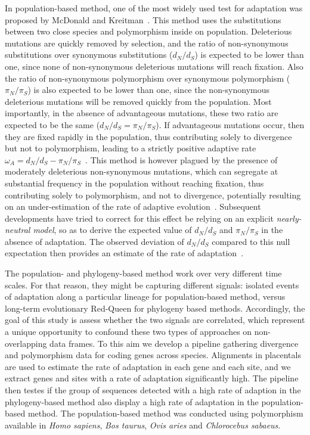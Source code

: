 \documentclass{article}
\newcommand{\dn}{d_N}
\newcommand{\ds}{d_S}
\newcommand{\dnds}{\dn / \ds}
\newcommand{\pn}{\pi_N}
\newcommand{\ps}{\pi_S}
\newcommand{\pnps}{\pn / \ps}
\begin{document}
In population-based method, one of the most widely used test for adaptation was proposed by McDonald and Kreitman~\citep{mcdonald_adaptative_1991}.
This method uses the substitutions between two close species and polymorphism inside on population.
Deleterious mutations are quickly removed by selection, and the ratio of non-synonymous substitutions over synonymous substitutions ($\dnds$) is expected to be lower than one, since none of non-synonymous deleterious mutations will reach fixation.
Also the ratio of non-synonymous polymorphism over synonymous polymorphism ($\pnps$) is also expected to be lower than one, since the non-synonymous deleterious mutations will be removed quickly from the population.
Most importantly, in the absence of advantageous mutations, these two ratio are expected to be the same ($\dnds=\pnps$).
If advantageous mutations occur, then they are fixed rapidly in the population, thus contributing solely to divergence but not to polymorphism, leading to a strictly positive adaptive rate $\omega_A = \dnds-\pnps$~\citep{smith_adaptive_2002}.
This method is however plagued by the presence of moderately deleterious non-synonymous mutations, which can segregate at substantial frequency in the population without reaching fixation, thus contributing solely to polymorphism, and not to divergence, potentially resulting on an under-estimation of the rate of adaptive evolution~\citep{eyre-walker_quantifying_2002}.
Subsequent developments have tried to correct for this effect be relying on an explicit \textit{nearly-neutral model}, so as to derive the expected value of $\dnds$ and $\pnps$ in the absence of adaptation.
The observed deviation of $\dnds$ compared to this null expectation then provides an estimate of the rate of adaptation~\citep{eyre-walker_estimating_2009, galtier_adaptive_2016}.

The population- and phylogeny-based method work over very different time scales.
For that reason, they might be capturing different signals: isolated events of adaptation along a particular lineage for population-based method, versus long-term evolutionary Red-Queen for phylogeny based methods.
Accordingly, the goal of this study is assess whether the two signals are correlated, which represent a unique opportunity to confound these two types of approaches on non-overlapping data frames.
To this aim we develop a pipeline gathering divergence and polymorphism data for coding genes across species.
Alignments in placentals are used to estimate the rate of adaptation in each gene and each site, and we extract genes and sites with a rate of adaptation significantly high.
The pipeline then testes if the group of sequences detected with a high rate of adaption in the phylogeny-based method also display a high rate of adaptation in the population-based method.
The population-based method was conducted using polymorphism available in \textit{Homo sapiens}, \textit{Bos taurus}, \textit{Ovis aries} and \textit{Chlorocebus sabaeus}.
\end{document}
